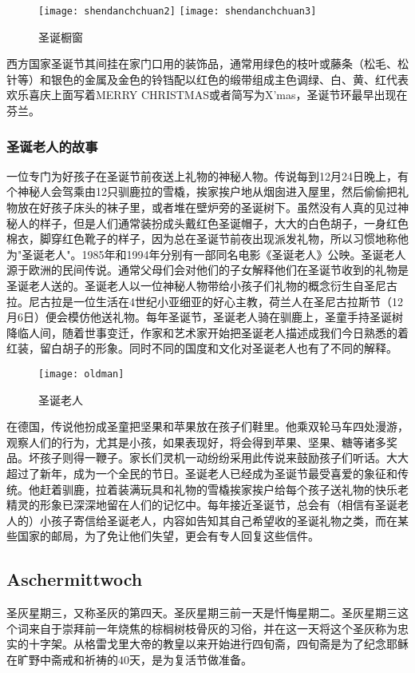 \begin{itemize}
\begin{figure}[htb]
    \texttt{[image: shendanchchuan2]}    
    \texttt{[image: shendanchchuan3]}
    \caption{圣诞橱窗}
\end{figure}

\end{itemize}

西方国家圣诞节其间挂在家门口用的装饰品，通常用绿色的枝叶或藤条（松毛、松针等）和银色的金属及金色的铃铛配以红色的缎带组成主色调绿、白、黄、红代表欢乐喜庆上面写着MERRY CHRISTMAS或者简写为X'mas，圣诞节环最早出现在芬兰。

\subsubsection{圣诞老人的故事}
一位专门为好孩子在圣诞节前夜送上礼物的神秘人物。传说每到12月24日晚上，有个神秘人会驾乘由12只驯鹿拉的雪橇，挨家挨户地从烟囱进入屋里，然后偷偷把礼物放在好孩子床头的袜子里，或者堆在壁炉旁的圣诞树下。虽然没有人真的见过神秘人的样子，但是人们通常装扮成头戴红色圣诞帽子，大大的白色胡子，一身红色棉衣，脚穿红色靴子的样子，因为总在圣诞节前夜出现派发礼物，所以习惯地称他为"圣诞老人"。1985年和1994年分别有一部同名电影《圣诞老人》公映。圣诞老人源于欧洲的民间传说。通常父母们会对他们的子女解释他们在圣诞节收到的礼物是圣诞老人送的。圣诞老人以一位神秘人物带给小孩子们礼物的概念衍生自圣尼古拉。尼古拉是一位生活在4世纪小亚细亚的好心主教，荷兰人在圣尼古拉斯节（12月6日）便会模仿他送礼物。每年圣诞节，圣诞老人骑在驯鹿上，圣童手持圣诞树降临人间，随着世事变迁，作家和艺术家开始把圣诞老人描述成我们今日熟悉的着红装，留白胡子的形象。同时不同的国度和文化对圣诞老人也有了不同的解释。
\begin{figure}[htb]
    \centering
    \texttt{[image: oldman]}
    \caption{圣诞老人}
\end{figure}

在德国，传说他扮成圣童把坚果和苹果放在孩子们鞋里。他乘双轮马车四处漫游，观察人们的行为，尤其是小孩，如果表现好，将会得到苹果、坚果、糖等诸多奖品。坏孩子则得一鞭子。家长们灵机一动纷纷采用此传说来鼓励孩子们听话。大大超过了新年，成为一个全民的节日。圣诞老人已经成为圣诞节最受喜爱的象征和传统。他赶着驯鹿，拉着装满玩具和礼物的雪橇挨家挨户给每个孩子送礼物的快乐老精灵的形象已深深地留在人们的记忆中。每年接近圣诞节，总会有（相信有圣诞老人的）小孩子寄信给圣诞老人，内容如告知其自己希望收的圣诞礼物之类，而在某些国家的邮局，为了免让他们失望，更会有专人回复这些信件。
\subsection{Aschermittwoch}

圣灰星期三，又称圣灰的第四天。圣灰星期三前一天是忏悔星期二。圣灰星期三这个词来自于崇拜前一年烧焦的棕榈树枝骨灰的习俗，并在这一天将这个圣灰称为忠实的十字架。从格雷戈里大帝的教皇以来开始进行四旬斋，四旬斋是为了纪念耶稣在旷野中斋戒和祈祷的40天，是为复活节做准备。